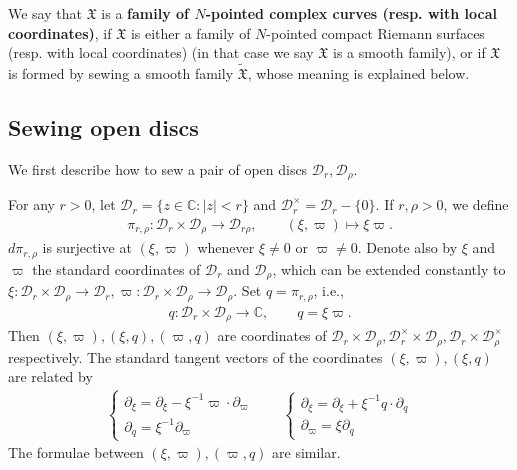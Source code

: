 \documentclass[12pt,a4paper,notitlepage]{article}
\theoremstyle{definition}
\theoremstyle{plain}
\newcommand{\fk}{\mathfrak}
\newcommand{\mc}{\mathcal}
\newcommand{\wtd}{\widetilde}
\newcommand{\mbb}{\mathbb}
\newcommand{\Cbb}{\mathbb C}
\numberwithin{equation}{section}
\begin{document}
We say that $\fk X$ is a \textbf{family of $N$-pointed complex curves (resp. with local coordinates)}, if $\fk X$ is either a family of $N$-pointed compact Riemann surfaces (resp. with local coordinates) (in that case we say $\fk X$ is a smooth family), or if $\fk X$ is formed by sewing a smooth family $\wtd{\fk X}$, whose meaning is  explained below. 

 


\subsection*{Sewing open discs}

We first describe how to sew a pair of open discs $\mc D_r,\mc D_\rho$. 

For any $r>0$, let  $\mc D_r=\{z\in\mbb C:|z|<r \}$ and $\mc D_r^\times=\mc D_r-\{0\}$.\index{Dr@$\mc D_r,\mc D_r^\times$} If $r,\rho>0$, we define \index{zz@$\pi_{r,\rho}:\mc D_r\times\mc D_\rho\rightarrow\mc D_{r\rho}$}
\begin{align}
\pi_{r,\rho}:\mc D_r\times\mc D_\rho\rightarrow\mc D_{r\rho},\qquad (\xi,\varpi)\mapsto \xi\varpi.
\end{align}
$d\pi_{r,\rho}$ is surjective at $(\xi,\varpi)$ whenever $\xi\neq 0$ or $\varpi\neq 0$. Denote also by $\xi$ and $\varpi$ the standard coordinates of $\mc D_r$ and $\mc D_\rho$, which can be extended constantly to $\xi:\mc D_r\times\mc D_\rho\rightarrow\mc D_r,\varpi:\mc D_r\times\mc D_\rho\rightarrow\mc D_\rho$. Set $q=\pi_{r,\rho}$, i.e.,
\begin{align*}
q:\mc D_r\times\mc D_\rho\rightarrow\Cbb,\qquad q=\xi\varpi.
\end{align*}
Then $(\xi,\varpi),(\xi,q),(\varpi,q)$ are coordinates  of $\mc D_r\times \mc D_\rho,\mc D_r^\times\times \mc D_\rho,\mc D_r\times \mc D_\rho^\times$ respectively. The standard tangent vectors of the coordinates $(\xi,\varpi),(\xi,q)$ are related by
\begin{gather}
\left\{ \begin{array}{l}
\partial_\xi=\partial_\xi-\xi^{-1}\varpi\cdot\partial_\varpi\\
\partial_q=\xi^{-1}\partial_\varpi
\end{array} \right.
\qquad
\left\{ \begin{array}{l}
\partial_\xi=\partial_\xi+\xi^{-1}q\cdot\partial_q\\
\partial_\varpi=\xi\partial_q
\end{array} \right.\label{eq23}
\end{gather}
The formulae between $(\xi,\varpi),(\varpi,q)$ are similar.
\end{document}
